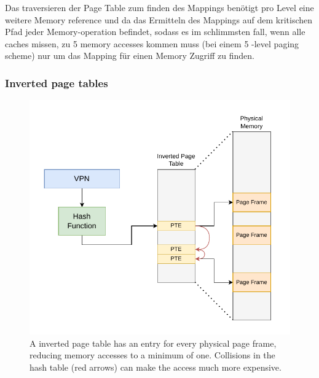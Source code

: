 Das traversieren der Page Table zum finden des Mappings benötigt pro Level eine weitere Memory reference
und da das Ermitteln des Mappings auf dem kritischen Pfad jeder Memory-operation befindet,  sodass
es im schlimmsten fall, wenn alle caches missen, zu 5 memory accesses kommen muss (bei einem 5 -level
paging scheme) nur um das Mapping für einen Memory Zugriff zu finden.
\subsubsection{Inverted page tables}
\begin{figure}[t]
    \centering
    \includegraphics[scale=1]{figures/inverted_pt.pdf}
    \caption[Simple Inverted Page Table Design]{A inverted page table has an entry for every physical
        page frame, reducing memory accesses to a minimum of one. Collisions in the hash table (red arrows) can
        make the access much more expensive. }
    \label{fig:fund:pagetree}
\end{figure}




